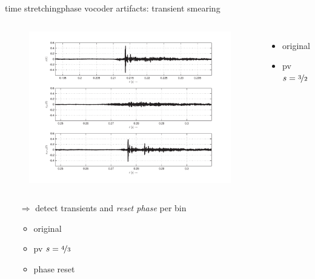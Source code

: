     \begin{frame}{time stretching}{phase vocoder artifacts: transient smearing}
        \vspace{-8mm}
        \begin{columns}
            \vspace{-3mm}
                \begin{figure}
                    \includegraphics[scale=.35]{graph/TransientSmear}
                \end{figure}

                \begin{itemize}
                \vspace{10mm}
                    \item   {}\; original  
                    \item   {}\; pv $s = \nicefrac{3}{2}$ 
                \end{itemize}
        \end{columns}
        \pause
        \vspace{-3mm}
        \begin{itemize}
            \item[$\Rightarrow$] detect transients and \textit{reset phase} per bin
                \begin{itemize}
                    \item   {}\; original  
                    \item   {}\; pv $s = \nicefrac{4}{3}$ 
                    \item   {}\; phase reset 
                \end{itemize}
        \end{itemize}
    \end{frame}

